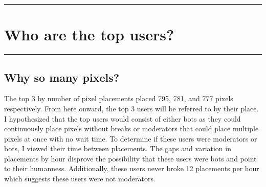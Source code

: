 {\color{gray}\hrule}
\section{Who are the top users?}
{\color{gray}\hrule}

\subsection{Why so many pixels?}
The top 3 by number of pixel placements placed 795, 781, and 777 pixels respectively. From here onward, the top 3 users will be referred to by their place. I hypothesized that the top users would consist of either bots as they could continuously place pixels without breaks or moderators that could place multiple pixels at once with no wait time. To determine if these users were moderators or bots, I viewed their time between placements. The gaps and variation in placements by hour disprove the possibility that these users were bots and point to their humanness. Additionally, these users never broke 12 placements per hour which suggests these users were not moderators. 


